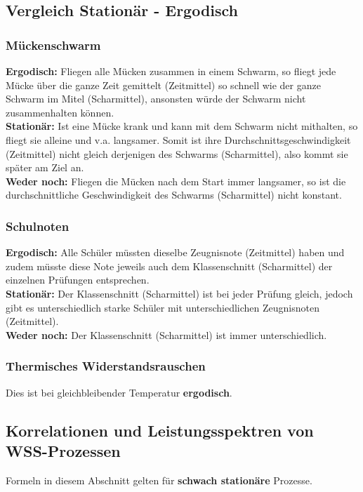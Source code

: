 \subsection{Vergleich Stationär - Ergodisch}
\subsubsection{Mückenschwarm}
\textbf{Ergodisch:} Fliegen alle Mücken zusammen in einem Schwarm, so fliegt jede Mücke über die
ganze Zeit gemittelt (Zeitmittel) so schnell wie der ganze Schwarm im Mitel (Scharmittel), ansonsten
würde der Schwarm nicht zusammenhalten können. \\
\textbf{Stationär:} Ist eine Mücke krank und kann mit dem Schwarm nicht mithalten, so fliegt sie
alleine und v.a. langsamer. Somit ist ihre Durchschnittsgeschwindigkeit (Zeitmittel) nicht gleich
derjenigen des Schwarms (Scharmittel), also kommt sie später am Ziel an. \\
\textbf{Weder noch:} Fliegen die Mücken nach dem Start immer langsamer, so ist die
durchschnittliche Geschwindigkeit des Schwarms (Scharmittel) nicht konstant.

\subsubsection{Schulnoten}
\textbf{Ergodisch:} Alle Schüler müssten dieselbe Zeugnisnote (Zeitmittel) haben und zudem müsste
diese Note jeweils auch dem Klassenschnitt (Scharmittel) der einzelnen Prüfungen entsprechen. \\
\textbf{Stationär:} Der Klassenschnitt (Scharmittel) ist bei jeder Prüfung gleich, jedoch gibt es
unterschiedlich starke Schüler mit unterschiedlichen Zeugnisnoten (Zeitmittel). \\
\textbf{Weder noch:} Der Klassenschnitt (Scharmittel) ist immer unterschiedlich.

\subsubsection{Thermisches Widerstandsrauschen} 
Dies ist bei gleichbleibender Temperatur \textbf{ergodisch}.


\subsection{Korrelationen und Leistungsspektren von WSS-Prozessen }
Formeln in diesem Abschnitt gelten für \textbf{schwach stationäre} Prozesse. \\

